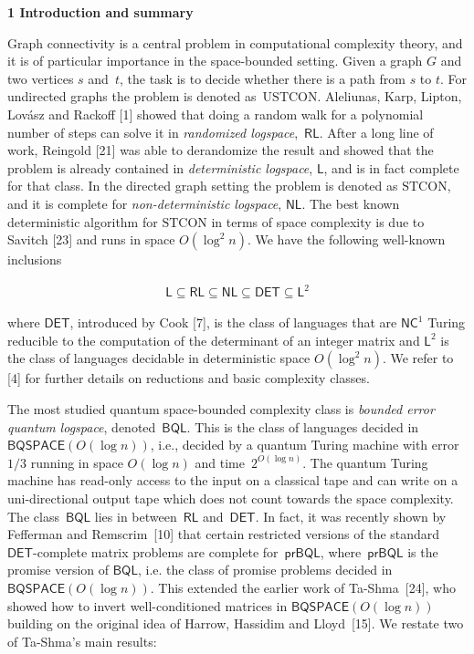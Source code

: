 

\par\medskip\noindent\textbf{
1 Introduction and summary}\par




Graph connectivity is a central problem in computational complexity theory, and it is of particular importance in the space-bounded setting.
Given a graph $G$ and two vertices $s$ and $t$, the task is to decide whether there is a path from $s$ to $t$.
For undirected graphs the problem is denoted as $\mathrm{USTCON}$. Aleliunas, Karp, Lipton, Lovász and Rackoff [1] showed that doing a random walk for a polynomial number of steps can solve it in \emph{randomized logspace}, $\mathsf{RL}$. After a long line of work, Reingold [21] was able to derandomize the result and showed that the problem is already contained in \emph{deterministic logspace}, $\mathsf{L}$, and is in fact complete for that class.
In the directed graph setting the problem is denoted as $\mathrm{STCON}$, and it is complete for \emph{non-deterministic logspace}, $\mathsf{NL}$. The best known deterministic algorithm for $\mathrm{STCON}$ in terms of space complexity is due to Savitch [23] and runs in space $O(\log^{2}n)$.
We have the following well-known inclusions\par


\[\begin{gathered}
\displaystyle\mathsf{L}\subseteq\mathsf{RL}\subseteq\mathsf{NL}\subseteq\mathsf{DET}\subseteq\mathsf{L}^{2}
\end{gathered}\]


where $\mathsf{DET}$, introduced by Cook [7], is the class of languages that are $\mathsf{NC}^{1}$ Turing reducible to the computation of the determinant of an integer matrix and $\mathsf{L}^{2}$ is the class of languages decidable in deterministic space $O(\log^{2}n)$.
We refer to [4] for further details on reductions and basic complexity classes.\par




The most studied quantum space-bounded complexity class is \emph{bounded error quantum logspace}, denoted $\mathsf{BQL}$.
This is the class of languages decided in $\mathsf{BQSPACE}(O(\log n))$, i.e., decided by a quantum Turing machine with error $1/3$ running in space $O(\log n)$ and time $2^{O(\log n)}$. The quantum Turing machine has read-only access to the input on a classical tape and can write on a uni-directional output tape which does not count towards the space complexity.
The class $\mathsf{BQL}$ lies in between $\mathsf{RL}$ and $\mathsf{DET}$.
In fact, it was recently shown by Fefferman and Remscrim [10] that certain restricted versions of the standard $\mathsf{DET}$-complete matrix problems are complete for $\mathsf{prBQL}$, where $\mathsf{prBQL}$ is the promise version of $\mathsf{BQL}$, i.e. the class of promise problems decided in $\mathsf{BQSPACE}(O(\log n))$.
This extended the earlier work of Ta-Shma [24], who showed how to invert well-conditioned matrices in $\mathsf{BQSPACE}(O(\log n))$ building on the original idea of Harrow, Hassidim and Lloyd [15].
We restate two of Ta-Shma’s main results:\par



